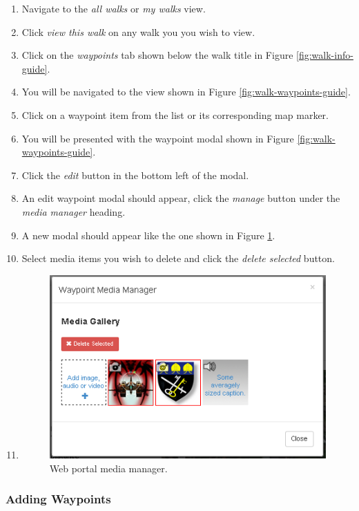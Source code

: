 \documentclass[11pt,a4paper]{report}
\begin{document}
\begin{enumerate}
\item Navigate to the \emph{all walks} or \emph{my walks} view.
\item Click \emph{view this walk} on any walk you you wish to view.
\item Click on the \emph{waypoints} tab shown below the walk title in Figure \ref{fig:walk-info-guide}.
\item You will be navigated to the view shown in Figure \ref{fig:walk-waypoints-guide}.
\item Click on a waypoint item from the list or its corresponding map marker.
\item You will be presented with the waypoint modal shown in Figure \ref{fig:walk-waypoints-guide}.
\item Click the \emph{edit} button in the bottom left of the modal.
\item An edit waypoint modal should appear, click the \emph{manage} button under the \emph{media manager} heading.
\item A new modal should appear like the one shown in Figure \ref{fig:media-gallery-guide}.
\item Select media items you wish to delete and click the \emph{delete selected} button.
\item 

\begin{figure}[h]
\centering
\includegraphics[width=0.7\linewidth]{./img/webportal/media-gallery}
\caption{Web portal media manager.}
\label{fig:media-gallery-guide}
\end{figure}


\end{enumerate}

\subsubsection{Adding Waypoints}
\end{document}
